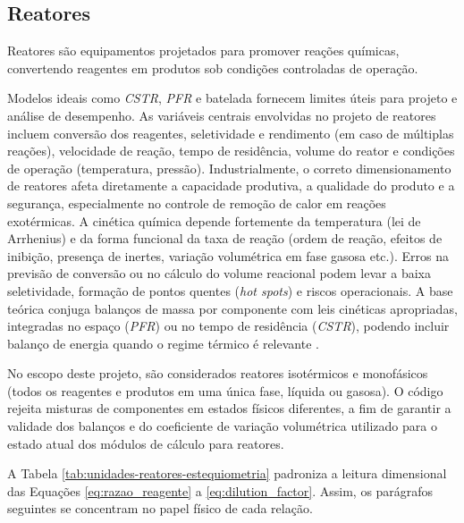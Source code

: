 \subsection{Reatores}

Reatores são equipamentos projetados para promover reações químicas, convertendo reagentes em produtos sob condições controladas de operação.

Modelos ideais como \textit{CSTR}, \textit{PFR} e batelada fornecem limites úteis para projeto e análise de desempenho. As variáveis centrais envolvidas no projeto de reatores incluem conversão dos reagentes, seletividade e rendimento (em caso de múltiplas reações), velocidade de reação, tempo de residência, volume do reator e condições de operação (temperatura, pressão). Industrialmente, o correto dimensionamento de reatores afeta diretamente a capacidade produtiva, a qualidade do produto e a segurança, especialmente no controle de remoção de calor em reações exotérmicas. A cinética química depende fortemente da temperatura (lei de Arrhenius) e da forma funcional da taxa de reação (ordem de reação, efeitos de inibição, presença de inertes, variação volumétrica em fase gasosa etc.). Erros na previsão de conversão ou no cálculo do volume reacional podem levar a baixa seletividade, formação de pontos quentes (\textit{hot spots}) e riscos operacionais. A base teórica conjuga balanços de massa por componente com leis cinéticas apropriadas, integradas no espaço (\textit{PFR}) ou no tempo de residência (\textit{CSTR}), podendo incluir balanço de energia quando o regime térmico é relevante \cite{fogler2009,levenspiel2000}.

No escopo deste projeto, são considerados reatores isotérmicos e monofásicos (todos os reagentes e produtos em uma única fase, líquida ou gasosa). O código rejeita misturas de componentes em estados físicos diferentes, a fim de garantir a validade dos balanços e do coeficiente de variação volumétrica utilizado para o estado atual dos módulos de cálculo para reatores.

A Tabela \ref{tab:unidades-reatores-estequiometria} padroniza a leitura dimensional das Equações \ref{eq:razao_reagente} a \ref{eq:dilution_factor}. Assim, os parágrafos seguintes se concentram no papel físico de cada relação.

